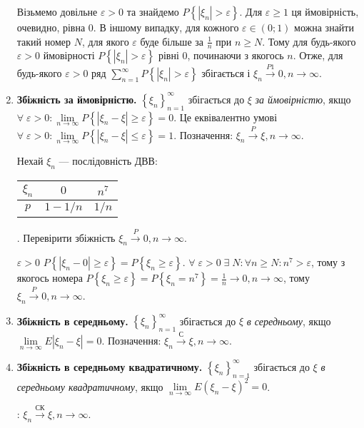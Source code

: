 \begin{enumerate}
\begin{example}
        Візьмемо довільне $\varepsilon > 0$ та знайдемо $P\left\{ |\xi_n| > \varepsilon\right\}$. Для $\varepsilon \geq 1$
        ця ймовірність, очевидно, рівна 0. В іншому випадку, для кожного $\varepsilon \in (0; 1)$ можна знайти такий номер $N$,
        для якого $\varepsilon$ буде більше за $\frac{1}{n}$ при $n \geq N$. Тому для будь-якого $\varepsilon >0$ ймовірності
        $P\left\{ |\xi_n| > \varepsilon\right\}$ рівні 0, починаючи з якогось $n$. Отже, для будь-якого $\varepsilon >0$ ряд 
        $\sum\limits_{n=1}^{\infty} P\left\{\left| \xi_n \right| > \varepsilon\right\}$ збігається і 
        $\xi_n \overset{P1}{\longrightarrow} 0, n \to \infty$.
    \end{example}
    \item \textbf{Збіжність за ймовірністю.}
    \noindent$\left\{ \xi_n\right\}_{n=1}^{\infty}$ збігається до $\xi$ \emph{за ймовірністю}, якщо 
    $\forall \; \varepsilon > 0: \underset{n \to \infty}{\lim} P\left\{|\xi_n - \xi| \geq \varepsilon\right\}= 0$.
    Це еквівалентно умові $\forall \; \varepsilon > 0: \underset{n \to \infty}{\lim} P\left\{|\xi_n - \xi| \leq \varepsilon\right\}= 1$.
    Позначення: $\xi_n \overset{P}{\longrightarrow} \xi, n \to \infty$.
    \begin{example}
        Нехай $\xi_n$ --- послідовність ДВВ: 
        \begin{tabular}{|c|c|c|}
            \hline
            $\xi_n$ & $0$ & $n^7$ \\
            \hline
            $p$ & $1-1/n$ & $1/n$ \\
            \hline
        \end{tabular}.
        Перевірити збіжність $\xi_n \overset{P}{\longrightarrow} 0, n \to \infty$.
        
         $\varepsilon >0$ $P\left\{|\xi_n -0| \geq \varepsilon\right\} = P\left\{ \xi_n \geq \varepsilon\right\}$.
        $\forall \; \varepsilon >0 \; \exists \; N: \forall n\geq N:n^7 > \varepsilon$, тому з якогось номера
        $P\left\{ \xi_n \geq \varepsilon\right\} = P\left\{ \xi_n = n^7 \right\} = \frac{1}{n} \to 0, n\to\infty$, тому $\xi_n \overset{P}{\longrightarrow} 0, n \to \infty$.
    \end{example}
    \item \textbf{Збіжність в середньому.}
    \noindent$\left\{ \xi_n\right\}_{n=1}^{\infty}$ збігається до $\xi$ \emph{в середньому},
    якщо $\underset{n \to \infty}{\lim} E|\xi_n - \xi| = 0$.
    Позначення: $\xi_n \overset{\text{С}}{\longrightarrow} \xi, n \to \infty$.
    \item \textbf{Збіжність в середньому квадратичному.}
    \noindent$\left\{ \xi_n\right\}_{n=1}^{\infty}$ збігається до $\xi$ \emph{в середньому квадратичному},
    якщо $\underset{n \to \infty}{\lim} E(\xi_n - \xi)^2 = 0$.
    
    : $\xi_n \overset{\text{СК}}{\longrightarrow} \xi, n \to \infty$.
\end{enumerate}

